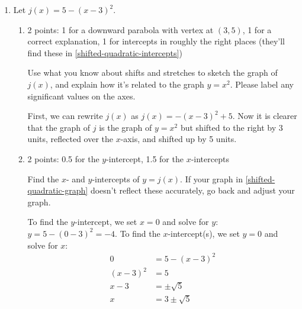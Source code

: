 \documentclass{article}
\begin{document}
\begin{enumerate}
\item  

  Let $j(x) = 5 - (x - 3)^2$.

  \begin{enumerate}
  \item \label{shifted-quadratic-graph}

    \begin{grading}
      2 points: 1 for a downward parabola with vertex at $(3, 5)$, 1 for a correct explanation, 1 for intercepts in roughly the right places (they'll find these in \ref{shifted-quadratic-intercepts})
    \end{grading}

    \begin{problem}[\vfill]
      Use what you know about shifts and stretches to sketch the graph of $j(x)$, and explain how it's related to the graph $y = x^2$. Please label any significant values on the axes. 
    \end{problem}

    \begin{solution}
      First, we can rewrite $j(x)$ as $j(x)=-(x-3)^2 + 5$. Now it is clearer that the graph of $j$ is the graph of $y=x^2$ but
      shifted to the right by 3 units, reflected over the $x$-axis, and shifted up by 5 units.

    \end{solution}

  \item \label{shifted-quadratic-intercepts}

    \begin{grading}
      2 points: 0.5 for the $y$-intercept, 1.5 for the $x$-intercepts
    \end{grading}

    \begin{problem}[\vfill]
      Find the $x$- and $y$-intercepts of $y = j(x)$. If your graph in \ref{shifted-quadratic-graph}  doesn't reflect these accurately, go back and adjust your graph.
    \end{problem}

    \begin{solution}
      To find the $y$-intercept, we set $x=0$ and solve for $y$: $y= 5-(0-3)^2 = -4$. To find the $x$-intercept(s),
      we set $y=0$ and solve for $x$:
      \begin{align*}
        0 &= 5-(x-3)^2 \\
        (x-3)^2 &= 5 \\
        x-3 &= \pm \sqrt{5} \\
        x &= 3 \pm \sqrt{5}
      \end{align*}


\end{solution}
\end{enumerate}
\end{enumerate}
\end{document}
